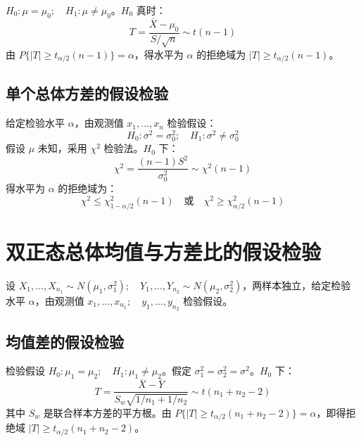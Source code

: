 \begin{theorem}
$H_0: \mu = \mu_0;\quad H_1: \mu \neq \mu_0$。$H_0$ 真时：
\begin{equation}
	T = \frac{\overline{X} - \mu_0}{S/\sqrt{n}} \sim t(n-1)
	\label{eq:假设检验:T}
\end{equation}
由 $P\{|T| \ge t_{\alpha/2}(n-1)\} = \alpha$，得水平为 $\alpha$ 的拒绝域为 $|T| \ge t_{\alpha/2}(n-1)$。
\end{theorem}

\subsection{单个总体方差的假设检验}
\begin{theorem}
给定检验水平 $\alpha$，由观测值 $x_1, \dots, x_n$ 检验假设：
\begin{equation}
	H_0: \sigma^2 = \sigma_0^2; \quad H_1: \sigma^2 \neq \sigma_0^2
	\label{eq:假设检验:方差假设}
\end{equation}
假设 $\mu$ 未知，采用 $\chi^2$ 检验法。$H_0$ 下：
\begin{equation}
	\chi^2 = \frac{(n-1)S^2}{\sigma_0^2} \sim \chi^2(n-1)
	\label{eq:假设检验:卡方}
\end{equation}
得水平为 $\alpha$ 的拒绝域为：
\begin{equation}
	\chi^2 \le \chi^2_{1-\alpha/2}(n-1) \quad \text{或} \quad \chi^2 \ge \chi^2_{\alpha/2}(n-1)
	\label{eq:假设检验:卡方拒绝域}
\end{equation}
\end{theorem}

\section{双正态总体均值与方差比的假设检验}
设 $X_1, \dots, X_{n_1} \sim N(\mu_1, \sigma_1^2);\quad Y_1, \dots, Y_{n_2} \sim N(\mu_2, \sigma_2^2)$，两样本独立，给定检验水平 $\alpha$，由观测值 $x_1, \dots, x_{n_1};\quad y_1, \dots, y_{n_2}$ 检验假设。

\subsection{均值差的假设检验}
\begin{theorem}
检验假设 $H_0: \mu_1 = \mu_2;\quad H_1: \mu_1 \neq \mu_2$。假定 $\sigma_1^2 = \sigma_2^2 = \sigma^2$。$H_0$ 下：
\begin{equation}
	T = \frac{\overline{X} - \overline{Y}}{S_w \sqrt{1/n_1 + 1/n_2}} \sim t(n_1 + n_2 - 2)
	\label{eq:假设检验:双总体T}
\end{equation}
其中 $S_w$ 是联合样本方差的平方根。由 $P\{|T| \ge t_{\alpha/2}(n_1 + n_2 - 2)\} = \alpha$，即得拒绝域 $|T| \ge t_{\alpha/2}(n_1 + n_2 - 2)$。
\end{theorem}

